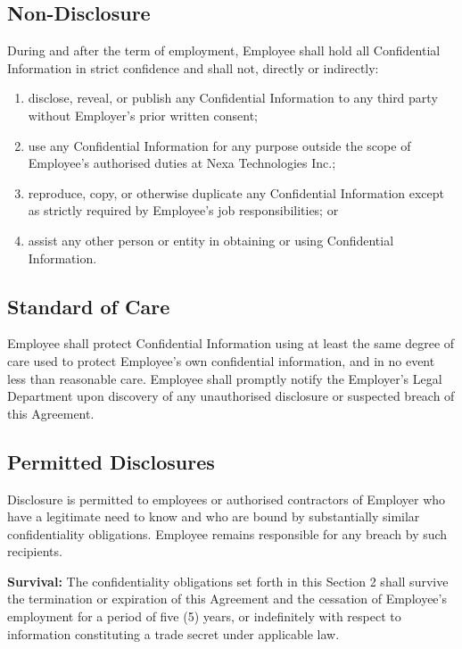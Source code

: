 \documentclass[11pt,a4paper]{article}
\begin{document}
\subsection{Non-Disclosure}
\noindent
During and after the term of employment, Employee shall hold all Confidential Information
in strict confidence and shall not, directly or indirectly:

\begin{enumerate}[label=\lbrack\arabic*\rbrack, leftmargin=2.5em, itemsep=3pt]
  \item disclose, reveal, or publish any Confidential Information to any third party
        without Employer's prior written consent;
  \item use any Confidential Information for any purpose outside the scope of Employee's
        authorised duties at Nexa Technologies Inc.;
  \item reproduce, copy, or otherwise duplicate any Confidential Information except as
        strictly required by Employee's job responsibilities; or
  \item assist any other person or entity in obtaining or using Confidential Information.
\end{enumerate}

\subsection{Standard of Care}
\noindent
Employee shall protect Confidential Information using at least the same degree of care
used to protect Employee's own confidential information, and in no event less than
reasonable care. Employee shall promptly notify the Employer's Legal Department upon
discovery of any unauthorised disclosure or suspected breach of this Agreement.

\subsection{Permitted Disclosures}
\noindent
Disclosure is permitted to employees or authorised contractors of Employer who have a
legitimate need to know and who are bound by substantially similar confidentiality
obligations. Employee remains responsible for any breach by such recipients.

\begin{tcolorbox}[clausebox]
  \small\color{TextDark}
  \textbf{\color{SlateBlue}Survival:}\enspace
  The confidentiality obligations set forth in this Section 2 shall survive the
  termination or expiration of this Agreement and the cessation of Employee's employment
  for a period of five (5) years, or indefinitely with respect to information
  constituting a trade secret under applicable law.
\end{tcolorbox}
\end{document}
